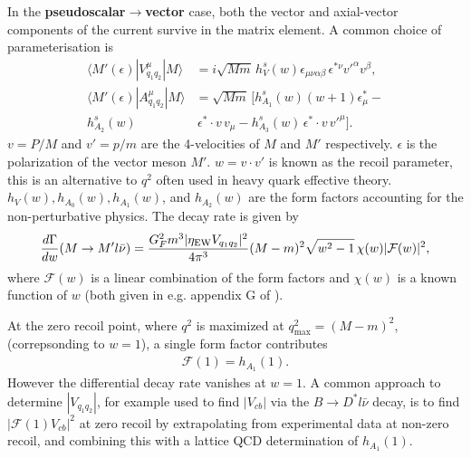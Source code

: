 In the {\bf{pseudoscalar$\to$vector}} case, both the vector and axial-vector components of the current survive in the matrix element. A common choice of parameterisation is
\begin{align}
  \langle M'(\epsilon)| V_{q_1q_2}^{\mu} | M \rangle &= i \sqrt{Mm}\, h^s_V(w) \epsilon_{\mu\nu\alpha\beta} \,\epsilon^{*\nu} v'^{\alpha} v^{\beta}, \\
  \langle M'(\epsilon)| A_{q_1q_2}^{\mu} | M \rangle &= \sqrt{Mm} \, [ h^s_{A_1}(w) (w+1) \epsilon^*_{\mu} - \\ \nonumber
    h^s_{A_2}(w)& \,\epsilon^*\cdot v \,v_{\mu} - h^s_{A_3}(w) \,\epsilon^*\cdot v \, v'^{\mu} ].
\end{align}
$v = P/M$ and $v' = p/m$ are the 4-velocities of $M$ and $M'$ respectively. $\epsilon$ is the polarization of the vector meson $M'$. $w = v\cdot v'$ is known as the recoil parameter, this is an alternative to $q^2$ often used in heavy quark effective theory. $h_V(w),h_{A_0}(w),h_{A_1}(w)$, and $h_{A_2}(w)$ are the form factors accounting for the non-perturbative physics. The decay rate is given by
\begin{align}
  {d\Gamma \over dw}(M\to M' l\bar{\nu}) = {G_F^2 m^3 | \eta_{\text{EW}} V_{q_1q_2} |^2 \over 4\pi^3 } (M-m)^2 \sqrt{w^2-1} \, \chi(w) |\mathcal{F}(w)|^2,
  \label{eq:pseudoscalar-vector-dr}
\end{align}
where $\mathcal{F}(w)$ is a linear combination of the form factors and $\chi(w)$ is a known function of $w$ (both given in e.g. appendix G of \cite{Harrison:2017fmw}).

At the zero recoil point, where $q^2$ is maximized at $q^2_{\text{max}} = (M-m)^2$, (correpsonding to $w=1$), a single form factor contributes
\begin{align}
  \mathcal{F}(1) = h_{A_1}(1).
\end{align}
However the differential decay rate vanishes at $w=1$. A common approach to determine $|V_{q_1q_2}|$, for example used to find $|V_{cb}|$ via the $B\to D^*l\bar{\nu}$ decay, is to find $|\mathcal{F}(1)V_{cb}|^2$ at zero recoil by extrapolating from experimental data at non-zero recoil, and combining this with a lattice QCD determination of $h_{A_1}(1)$.

